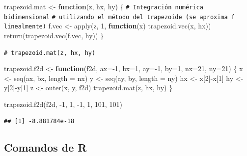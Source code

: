 \documentclass[
]{book}
\newenvironment{Shaded}{\begin{snugshade}}{\end{snugshade}}
\newcommand{\AttributeTok}[1]{\textcolor[rgb]{0.77,0.63,0.00}{#1}}
\newcommand{\CommentTok}[1]{\textcolor[rgb]{0.56,0.35,0.01}{\textit{#1}}}
\newcommand{\ControlFlowTok}[1]{\textcolor[rgb]{0.13,0.29,0.53}{\textbf{#1}}}
\newcommand{\DecValTok}[1]{\textcolor[rgb]{0.00,0.00,0.81}{#1}}
\newcommand{\FunctionTok}[1]{\textcolor[rgb]{0.00,0.00,0.00}{#1}}
\newcommand{\NormalTok}[1]{#1}
\newcommand{\OtherTok}[1]{\textcolor[rgb]{0.56,0.35,0.01}{#1}}
\newcommand{\SpecialCharTok}[1]{\textcolor[rgb]{0.00,0.00,0.00}{#1}}
\theoremstyle{break}
\theoremstyle{nonumberplain}
\renewcommand{\CommentTok}[1]{\textcolor[rgb]{0.41,0.41,0.41}{\texttt{#1}}}
\begin{document}
\begin{Shaded}
\begin{Highlighting}[]
\NormalTok{trapezoid.mat }\OtherTok{\textless{}{-}} \ControlFlowTok{function}\NormalTok{(z, hx, hy) \{ }
\CommentTok{\# Integración numérica bidimensional}
\CommentTok{\# utilizando el método del trapezoide (se aproxima f linealmente)}
\NormalTok{  f.vec }\OtherTok{\textless{}{-}} \FunctionTok{apply}\NormalTok{(z, }\DecValTok{1}\NormalTok{, }\ControlFlowTok{function}\NormalTok{(x) }\FunctionTok{trapezoid.vec}\NormalTok{(x, hx))}
  \FunctionTok{return}\NormalTok{(}\FunctionTok{trapezoid.vec}\NormalTok{(f.vec, hy)) }
\NormalTok{\}}

\CommentTok{\# trapezoid.mat(z, hx, hy) }

\NormalTok{trapezoid.f2d }\OtherTok{\textless{}{-}} \ControlFlowTok{function}\NormalTok{(f2d, }\AttributeTok{ax=}\SpecialCharTok{{-}}\DecValTok{1}\NormalTok{, }\AttributeTok{bx=}\DecValTok{1}\NormalTok{, }\AttributeTok{ay=}\SpecialCharTok{{-}}\DecValTok{1}\NormalTok{, }\AttributeTok{by=}\DecValTok{1}\NormalTok{, }\AttributeTok{nx=}\DecValTok{21}\NormalTok{, }\AttributeTok{ny=}\DecValTok{21}\NormalTok{) \{ }
\NormalTok{  x }\OtherTok{\textless{}{-}} \FunctionTok{seq}\NormalTok{(ax, bx, }\AttributeTok{length =}\NormalTok{ nx)}
\NormalTok{  y }\OtherTok{\textless{}{-}} \FunctionTok{seq}\NormalTok{(ay, by, }\AttributeTok{length =}\NormalTok{ ny)}
\NormalTok{  hx }\OtherTok{\textless{}{-}}\NormalTok{ x[}\DecValTok{2}\NormalTok{]}\SpecialCharTok{{-}}\NormalTok{x[}\DecValTok{1}\NormalTok{]}
\NormalTok{  hy }\OtherTok{\textless{}{-}}\NormalTok{ y[}\DecValTok{2}\NormalTok{]}\SpecialCharTok{{-}}\NormalTok{y[}\DecValTok{1}\NormalTok{]}
\NormalTok{  z }\OtherTok{\textless{}{-}} \FunctionTok{outer}\NormalTok{(x, y, f2d)}
  \FunctionTok{trapezoid.mat}\NormalTok{(z, hx, hy)}
\NormalTok{\}}

\FunctionTok{trapezoid.f2d}\NormalTok{(f2d, }\SpecialCharTok{{-}}\DecValTok{1}\NormalTok{, }\DecValTok{1}\NormalTok{, }\SpecialCharTok{{-}}\DecValTok{1}\NormalTok{, }\DecValTok{1}\NormalTok{, }\DecValTok{101}\NormalTok{, }\DecValTok{101}\NormalTok{) }
\end{Highlighting}
\end{Shaded}

\begin{verbatim}
## [1] -8.881784e-18
\end{verbatim}

\hypertarget{comandos-de-r-1}{%
\subsection{Comandos de R}\label{comandos-de-r-1}}
\end{document}
